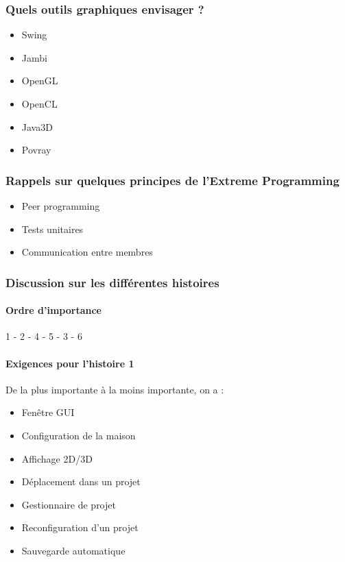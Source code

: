 \documentclass[12pt,a4paper]{article}
\begin{document}
		\subsubsection{Quels outils graphiques envisager ?}
			\begin{itemize}
				\item Swing
				\item Jambi
				\item OpenGL
				\item OpenCL
				\item Java3D
				\item Povray
			\end{itemize}
		\subsubsection{Rappels sur quelques principes de l'Extreme Programming}
			\begin{itemize}
				\item Peer programming
				\item Tests unitaires
				\item Communication entre membres
			\end{itemize}
		\subsubsection{Discussion sur les différentes histoires}
			\paragraph{Ordre d'importance}
				1 - 2 - 4 - 5 - 3 - 6
			\paragraph{Exigences pour l'histoire 1 \\}
				De la plus importante à la moins importante, on a :
				\begin{itemize}
					\item Fenêtre GUI
					\item Configuration de la maison
					\item Affichage 2D/3D
					\item Déplacement dans un projet
					\item Gestionnaire de projet
					\item Reconfiguration d'un projet
					\item Sauvegarde automatique
				\end{itemize}
\end{document}
